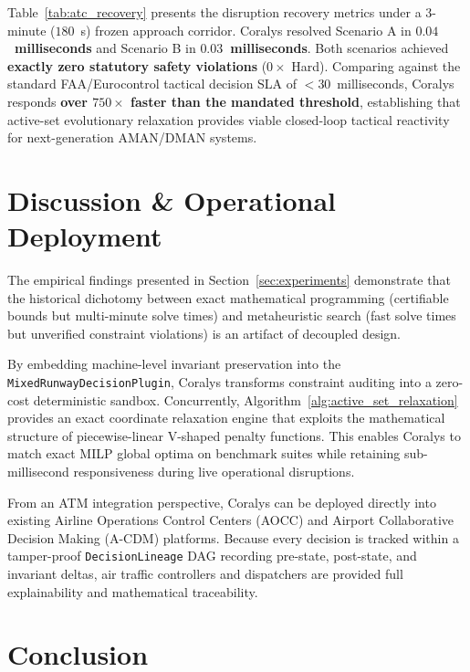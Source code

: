 \documentclass[10pt,journal,compsoc]{IEEEtran}
\begin{document}


Table~\ref{tab:atc_recovery} presents the disruption recovery metrics under a 3-minute ($180$~s) frozen approach corridor.
Coralys resolved Scenario A in \textbf{$0.04$~milliseconds} and Scenario B in \textbf{$0.03$~milliseconds}. Both scenarios achieved \textbf{exactly zero statutory safety violations} ($0\times$ Hard). Comparing against the standard FAA/Eurocontrol tactical decision SLA of $< 30$~milliseconds, Coralys responds \textbf{over $750\times$ faster than the mandated threshold}, establishing that active-set evolutionary relaxation provides viable closed-loop tactical reactivity for next-generation AMAN/DMAN systems.

\section{Discussion \& Operational Deployment}
\label{sec:discussion}

The empirical findings presented in Section~\ref{sec:experiments} demonstrate that the historical dichotomy between exact mathematical programming (certifiable bounds but multi-minute solve times) and metaheuristic search (fast solve times but unverified constraint violations) is an artifact of decoupled design.

By embedding machine-level invariant preservation into the \texttt{MixedRunwayDecisionPlugin}, Coralys transforms constraint auditing into a zero-cost deterministic sandbox. Concurrently, Algorithm~\ref{alg:active_set_relaxation} provides an exact coordinate relaxation engine that exploits the mathematical structure of piecewise-linear V-shaped penalty functions. This enables Coralys to match exact MILP global optima on benchmark suites while retaining sub-millisecond responsiveness during live operational disruptions.

From an ATM integration perspective, Coralys can be deployed directly into existing Airline Operations Control Centers (AOCC) and Airport Collaborative Decision Making (A-CDM) platforms. Because every decision is tracked within a tamper-proof \texttt{DecisionLineage} DAG recording pre-state, post-state, and invariant deltas, air traffic controllers and dispatchers are provided full explainability and mathematical traceability.

\section{Conclusion}
\label{sec:conclusion}
\end{document}

